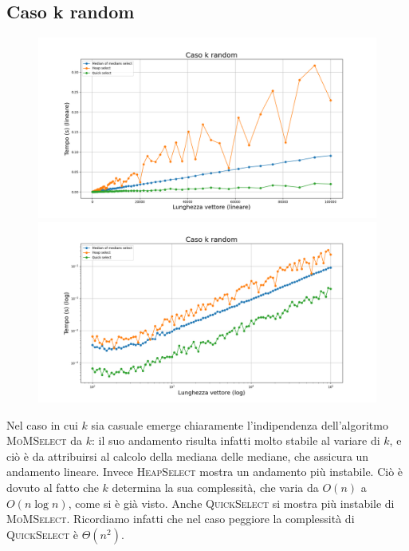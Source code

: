 \documentclass[a4paper,12pt]{article}
\newcommand{\QuickSelect}{\textsc{QuickSelect}}
\newcommand{\HeapSelect}{\textsc{HeapSelect}}
\newcommand{\MoMSelect}{\textsc{MoMSelect}}
\begin{document}
\subsection{Caso k random}
\begin{figure}[h]
            \centering
            \includegraphics[width=.83\textwidth]{graphs/k_random_n.png}
            \includegraphics[width=.83\textwidth]{graphs/k_random_2xlog.png}
\end{figure}

Nel caso in cui $k$ sia casuale emerge chiaramente l'indipendenza dell'algoritmo \MoMSelect{} da $k$: il suo andamento risulta infatti molto stabile al variare di $k$, e ciò è da attribuirsi al calcolo della mediana delle mediane, che assicura un andamento lineare.
Invece \HeapSelect{} mostra un andamento più instabile.
Ciò è dovuto al fatto che $k$ determina la sua complessità, che varia da $O(n)$ a $O(n\log n)$, come si è già visto.
Anche \QuickSelect{} si mostra più instabile di \MoMSelect{}.
Ricordiamo infatti che nel caso peggiore la complessità di \QuickSelect{} è $\Theta(n^2)$.



\newpage
\end{document}
